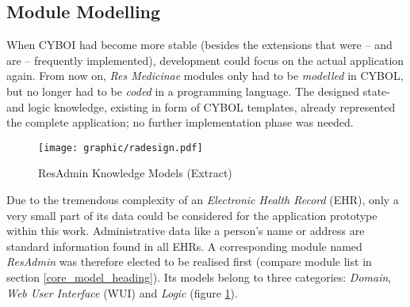 %
%
%
%
%
%
%

\subsection{Module Modelling}
\label{module_modelling_heading}

When CYBOI had become more stable (besides the extensions that were -- and are
-- frequently implemented), development could focus on the actual application
again. From now on, \emph{Res Medicinae} modules only had to be \emph{modelled}
in CYBOL, but no longer had to be \emph{coded} in a programming language. The
designed state- and logic knowledge, existing in form of CYBOL templates,
already represented the complete application; no further implementation phase
was needed.

\begin{figure}[ht]
    \begin{center}
        \texttt{[image: graphic/radesign.pdf]}
        \caption{ResAdmin Knowledge Models (Extract)}
        \label{radesign_figure}
    \end{center}
\end{figure}

Due to the tremendous complexity of an \emph{Electronic Health Record} (EHR),
only a very small part of its data could be considered for the application
prototype within this work. Administrative data like a person's name or address
are standard information found in all EHRs. A corresponding module named
\emph{ResAdmin} \cite{holzmueller2005} was therefore elected to be realised
first (compare module list in section \ref{core_model_heading}). Its models
belong to three categories: \emph{Domain}, \emph{Web User Interface} (WUI) and
\emph{Logic} (figure \ref{radesign_figure}).

